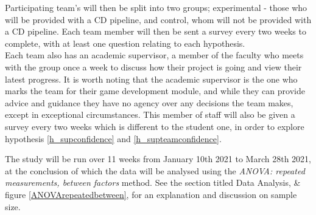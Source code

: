 \documentclass[journal]{IEEEtran}
\begin{document}
Participating team's will then be split into two groups; experimental - those who will be provided with a CD pipeline, and control, whom will not be provided with a CD pipeline. Each team member will then be sent a survey every two weeks to complete, with at least one question relating to each hypothesis. \\
Each team also has an academic supervisor, a member of the faculty who meets with the group once a week to discuss how their project is going and view their latest progress. It is worth noting that the academic supervisor is the one who marks the team for their game development module, and while they can provide advice and guidance they have no agency over any decisions the team makes, except in exceptional circumstances. This member of staff will also be given a survey every two weeks which is different to the student one, in order to explore hypothesis \ref{h_supconfidence} and \ref{h_supteamconfidence}.

The study will be run over 11 weeks from January 10th 2021 to March 28th 2021, at the conclusion of which the data will be analysed using the \textit{ANOVA: repeated measurements, between factors} method. See the section titled Data Analysis, \& figure \ref{ANOVArepeatedbetween}, for an explanation and discussion on sample size.
\end{document}
